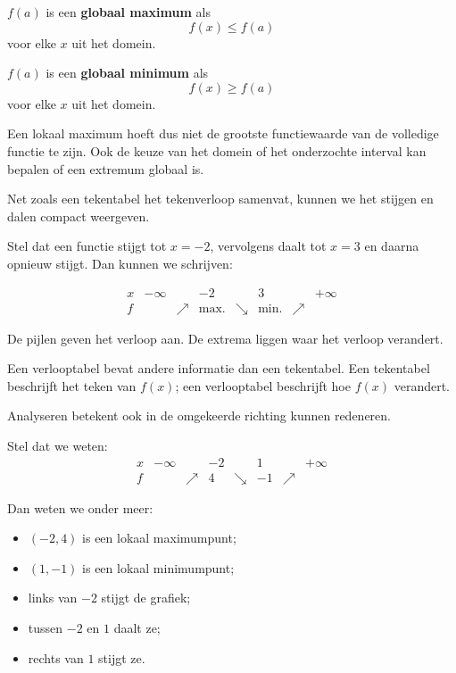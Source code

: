 \documentclass{ximera}
\begin{document}
\begin{definitie}
\(f(a)\) is een \textbf{globaal maximum} als
\[
f(x)\leq f(a)
\]
voor elke \(x\) uit het domein.

\(f(a)\) is een \textbf{globaal minimum} als
\[
f(x)\geq f(a)
\]
voor elke \(x\) uit het domein.
\end{definitie}

\begin{opmerking}
Een lokaal maximum hoeft dus niet de grootste functiewaarde van de volledige functie te zijn.
Ook de keuze van het domein of het onderzochte interval kan bepalen of een extremum globaal is.
\end{opmerking}


Net zoals een tekentabel het tekenverloop samenvat, kunnen we het stijgen en dalen
compact weergeven.

Stel dat een functie stijgt tot \(x=-2\), vervolgens daalt tot \(x=3\)
en daarna opnieuw stijgt. Dan kunnen we schrijven:

\[
\begin{array}{c|ccccccc}
x & -\infty & & -2 & & 3 & & +\infty\\
\hline
f & & \nearrow & \text{max.} & \searrow & \text{min.} & \nearrow &
\end{array}
\]

De pijlen geven het verloop aan. De extrema liggen waar het verloop verandert.

\begin{opmerking}
Een verlooptabel bevat andere informatie dan een tekentabel.
Een tekentabel beschrijft het teken van \(f(x)\);
een verlooptabel beschrijft hoe \(f(x)\) verandert.
\end{opmerking}


Analyseren betekent ook in de omgekeerde richting kunnen redeneren.

Stel dat we weten:
\[
\begin{array}{c|ccccccc}
x & -\infty && -2 && 1 && +\infty\\
\hline
f & &\nearrow& 4 &\searrow& -1 &\nearrow&
\end{array}
\]

Dan weten we onder meer:
\begin{itemize}
  \item \((-2,4)\) is een lokaal maximumpunt;
  \item \((1,-1)\) is een lokaal minimumpunt;
  \item links van \(-2\) stijgt de grafiek;
  \item tussen \(-2\) en \(1\) daalt ze;
  \item rechts van \(1\) stijgt ze.
\end{itemize}
\end{document}
